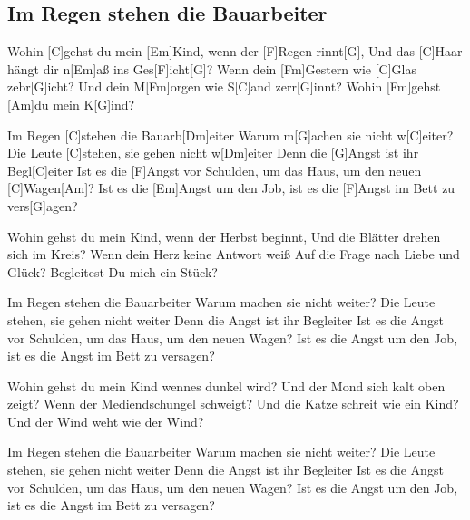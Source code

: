 \subsection*{Im Regen stehen die Bauarbeiter   }
\begin{guitar}

Wohin [C]gehst du mein [Em]Kind, wenn der [F]Regen rinnt[G],
Und das [C]Haar hängt dir n[Em]aß ins Ges[F]icht[G]?
Wenn dein [Fm]Gestern wie [C]Glas zebr[G]icht?
Und dein M[Fm]orgen wie S[C]and zerr[G]innt?
Wohin [Fm]gehst [Am]du mein K[G]ind?



Im Regen [C]stehen die Bauarb[Dm]eiter
Warum m[G]achen sie nicht w[C]eiter?
Die Leute [C]stehen, sie gehen nicht w[Dm]eiter
Denn die [G]Angst ist ihr Begl[C]eiter
Ist es die [F]Angst vor Schulden, um das Haus, um den neuen [C]Wagen[Am]?
Ist es die [Em]Angst um den Job, ist es die [F]Angst im Bett zu vers[G]agen?



Wohin gehst du mein Kind, wenn der Herbst beginnt,
Und die Blätter drehen sich im Kreis?
Wenn dein Herz keine Antwort weiß
Auf die Frage nach Liebe und Glück?
Begleitest Du mich ein Stück?


Im Regen stehen die Bauarbeiter
Warum machen sie nicht weiter?
Die Leute stehen, sie gehen nicht weiter
Denn die Angst ist ihr Begleiter
Ist es die Angst vor Schulden, um das Haus, um den neuen Wagen?
Ist es die Angst um den Job, ist es die Angst im Bett zu versagen?


Wohin gehst du mein Kind wennes dunkel wird?
Und der Mond sich kalt oben zeigt?
Wenn der Mediendschungel schweigt?
Und die Katze schreit wie ein Kind?
Und der Wind weht wie der Wind?


Im Regen stehen die Bauarbeiter
Warum machen sie nicht weiter?
Die Leute stehen, sie gehen nicht weiter
Denn die Angst ist ihr Begleiter
Ist es die Angst vor Schulden, um das Haus, um den neuen Wagen?
Ist es die Angst um den Job, ist es die Angst im Bett zu versagen?
\end{guitar}
